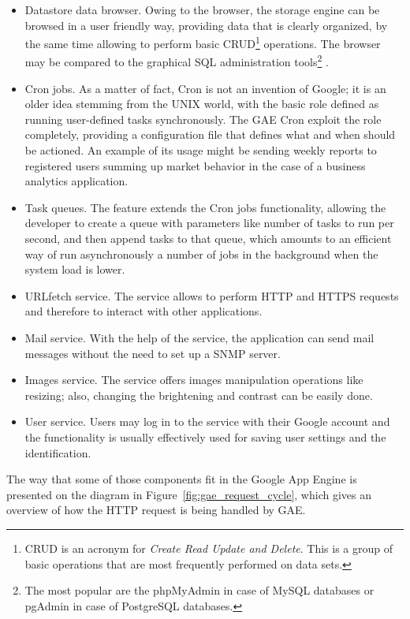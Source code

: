 \begin{itemize}
\item{Datastore data browser. Owing to the browser, the storage engine can be browsed in a user friendly way, providing data that is clearly organized, by the same time allowing to perform basic CRUD\footnote{CRUD is an acronym for \textit{Create Read Update and Delete}. This is a group of basic operations that are most frequently performed on data sets.} operations. The browser may be compared to the graphical SQL administration tools\footnote{The most popular are the phpMyAdmin in case of MySQL databases or pgAdmin in case of PostgreSQL databases.} .}
\item{Cron jobs.} As a matter of fact, Cron is not an invention of Google; it is an older idea stemming from the UNIX world, with the basic role defined as running user-defined tasks synchronously. The GAE Cron exploit the role completely, providing a configuration file that defines what and when should be actioned. An example of its usage might be sending weekly reports to registered users summing up market behavior in the case of a business analytics application.     
\item{Task queues.} The feature extends the Cron jobs functionality, allowing the developer to create a queue with parameters like number of tasks to run per second, and then append tasks to that queue, which amounts to an efficient way of run asynchronously a number of jobs in the background when the system load is lower.  
\item{URLfetch service. The service allows to perform HTTP and HTTPS requests and therefore to interact with other applications.}
\item{Mail service. With the help of the service, the application can send mail messages without the need to set up a SNMP server.}
\item{Images service. The service offers images manipulation operations like resizing; also, changing the brightening and contrast can be easily done.    }
\item{User service. Users may log in to the service with their Google account and the functionality is usually effectively used for saving user settings and the identification.} 
\end{itemize}
The way that some of those components fit in the Google App Engine is presented on the diagram in Figure~\ref{fig:gae_request_cycle}, which gives an overview of how the HTTP request is being handled by GAE. 
